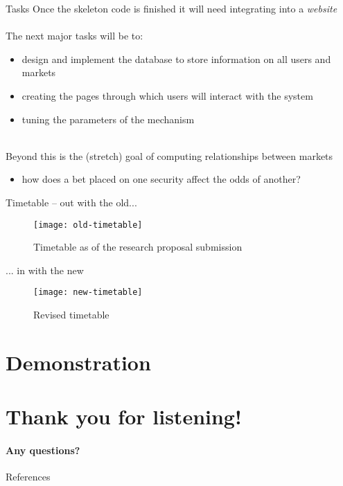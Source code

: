 \documentclass[9pt]{beamer}
\begin{document}
\begin{frame}{Tasks}
    Once the skeleton code is finished it will need integrating into a \emph{website} \\~\\
    
    The next major tasks will be to:
    \begin{itemize}
        \item design and implement the database to store information on all users and markets
        \item creating the pages through which users will interact with the system
        \item tuning the parameters of the mechanism 
    \end{itemize}~\\
    
    Beyond this is the (stretch) goal of computing relationships between markets
    \begin{itemize}
        \item how does a bet placed on one security affect the odds of another?
    \end{itemize}
\end{frame}

\begin{frame}{Timetable -- out with the old...}
    \begin{figure}
        \centering
        \texttt{[image: old-timetable]}
        \caption{Timetable as of the research proposal submission}
        \label{fig:oldTimetable}
    \end{figure}
\end{frame}

\begin{frame}{... in with the new}
    \begin{figure}
        \centering
        \texttt{[image: new-timetable]}
        \caption{Revised timetable}
        \label{fig:newTimetable}
    \end{figure}
\end{frame}

\section{Demonstration}

\section{Thank you for listening!}
\framesubtitle{Any questions?}

\begin{frame}{References}
    
    
\end{frame}
\end{document}
